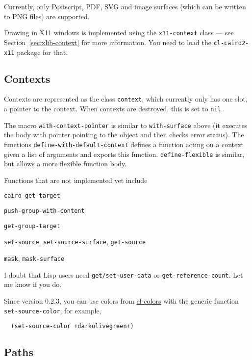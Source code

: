 \documentclass[12pt,letterpaper]{article}
\begin{document}
Currently, only Postscript, PDF, SVG and image surfaces (which can be
written to PNG files) are supported.

Drawing in X11 windows is implemented using the
\lstinline!x11-context! class --- see Section~\ref{sec:xlib-context}
for more information.  You need to load the \lstinline!cl-cairo2-x11!
package for that.

\subsection{Contexts}
\label{sec:contexts}

Contexts are represented as the class \lstinline!context!, which
currently only has one slot, a pointer to the context.  When contexts
are destroyed, this is set to \lstinline!nil!.

The macro \lstinline!with-context-pointer! is similar to
\lstinline!with-surface! above (it executes the body with pointer
pointing to the object and then checks error status).  The functions
\lstinline!define-with-default-context! defines a function acting on a
context given a list of arguments and exports this function.
\lstinline!define-flexible! is similar, but allows a more flexible
function body.

Functions that are not implemented yet include
\begin{compactitem}
  \item \lstinline!cairo-get-target!
  \item \lstinline!push-group-with-content!
  \item \lstinline!get-group-target!
  \item \lstinline!set-source!, \lstinline!set-source-surface!,
    \lstinline!get-source!
  \item \lstinline!mask!, \lstinline!mask-surface!
\end{compactitem}
I doubt that Lisp users need \lstinline!get/set-user-data! or
\lstinline!get-reference-count!.  Let me know if you do.

Since version 0.2.3, you can use colors from
\href{http://www.cliki.net/cl-colors}{cl-colors} with the generic
function \lstinline!set-source-color!, for example,
\begin{lstlisting}
  (set-source-color +darkolivegreen+)
\end{lstlisting}


\subsection{Paths}
\label{sec:paths}
\end{document}
